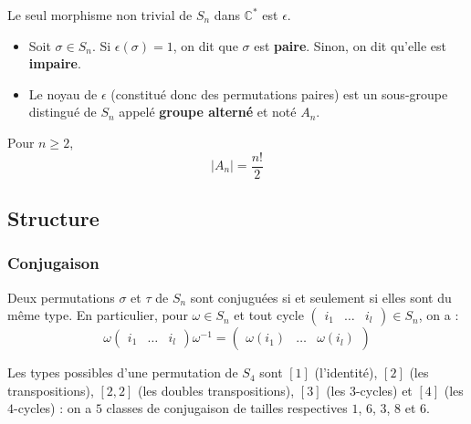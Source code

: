
  \begin{proposition}
    Le seul morphisme non trivial de $S_n$ dans $\mathbb{C}^*$ est $\epsilon$.
  \end{proposition}


  \begin{definition}
    \begin{itemize}
      \item Soit $\sigma \in S_n$. Si $\epsilon(\sigma) = 1$, on dit que $\sigma$ est \textbf{paire}. Sinon, on dit qu'elle est \textbf{impaire}.
      \item Le noyau de $\epsilon$ (constitué donc des permutations paires) est un sous-groupe distingué de $S_n$ appelé \textbf{groupe alterné} et noté $A_n$.
    \end{itemize}
  \end{definition}

  \begin{proposition}
    Pour $n \geq 2$,
    \[ |A_n| = \frac{n!}{2} \]
  \end{proposition}

  \subsection{Structure}

  \subsubsection{Conjugaison}


  \begin{proposition}
    Deux permutations $\sigma$ et $\tau$ de $S_n$ sont conjuguées si et seulement si elles sont du même type. En particulier, pour $\omega \in S_n$ et tout cycle $\begin{pmatrix} i_1 & \dots & i_l \end{pmatrix} \in S_n$, on a :
    \[ \omega \begin{pmatrix} i_1 & \dots & i_l \end{pmatrix} \omega^{-1} = \begin{pmatrix} \omega(i_1) & \dots & \omega(i_l) \end{pmatrix} \]
  \end{proposition}

  \begin{example}
    Les types possibles d'une permutation de $S_4$ sont $[1]$ (l'identité), $[2]$ (les transpositions), $[2,2]$ (les doubles transpositions), $[3]$ (les $3$-cycles) et $[4]$ (les $4$-cycles) : on a $5$ classes de conjugaison de tailles respectives $1$, $6$, $3$, $8$ et $6$.
  \end{example}

